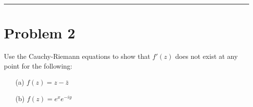 \documentclass{article}
\begin{document}
\vspace{1cm}
\hrule %

\section*{Problem 2}
Use the Cauchy-Riemann equations to show that $f'(z)$ does not exist at any point for the following:

\begin{enumerate}
  \item[(a)] $f (z) = z - \bar z$
  \item[(b)] $f (z) = e^xe^{-iy}$
\end{enumerate}
\vspace{1cm} %


% 
\end{document}
